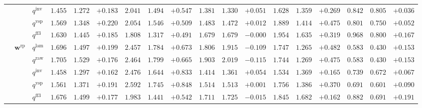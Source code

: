 \documentclass[eng]{kjas3}
\begin{document}
\begin{table}[t]
{\begin{tabular}{lll ccc ccc ccc ccc ccc}
 &  & $q^{\mathrm{inv}}$ & $1.455$ & $1.272$ & \cellcolor{posgreen!50}$+0.183$ & $2.041$ & $1.494$ & \cellcolor{posgreen!50}$+0.547$ & $1.381$ & $1.330$ & \cellcolor{posgreen!50}$+0.051$ & $1.628$ & $1.359$ & \cellcolor{posgreen!50}$+0.269$ & $0.842$ & $0.805$ & \cellcolor{posgreen!50}$+0.036$ \\
 &  & $q^{\mathrm{vsp}}$ & $1.569$ & $1.348$ & \cellcolor{posgreen!50}$+0.220$ & $2.054$ & $1.546$ & \cellcolor{posgreen!50}$+0.509$ & $1.483$ & $1.472$ & \cellcolor{posgreen!50}$+0.012$ & $1.889$ & $1.414$ & \cellcolor{posgreen!50}$+0.475$ & $0.801$ & $0.750$ & \cellcolor{posgreen!50}$+0.052$ \\
 &  & $q^{\mathrm{ff3}}$ & $1.630$ & $1.445$ & \cellcolor{posgreen!50}$+0.185$ & $1.808$ & $1.317$ & \cellcolor{posgreen!50}$+0.491$ & $1.679$ & $1.679$ & $-0.000$ & $1.954$ & $1.635$ & \cellcolor{posgreen!50}$+0.319$ & $0.968$ & $0.800$ & \cellcolor{posgreen!50}$+0.167$ \\
\cmidrule(lr){2-18}
 & $\mathbf{w}^{\mathrm{rp}}$ & $q^{\mathrm{lam}}$ & $1.696$ & $1.497$ & \cellcolor{posgreen!50}$+0.199$ & $2.457$ & $1.784$ & \cellcolor{posgreen!50}$+0.673$ & $1.806$ & $1.915$ & \cellcolor{negred!50}$-0.109$ & $1.747$ & $1.265$ & \cellcolor{posgreen!50}$+0.482$ & $0.583$ & $0.430$ & \cellcolor{posgreen!50}$+0.153$ \\
 &  & $q^{\mathrm{raw}}$ & $1.705$ & $1.529$ & \cellcolor{posgreen!50}$+0.176$ & $2.464$ & $1.799$ & \cellcolor{posgreen!50}$+0.665$ & $1.903$ & $2.019$ & \cellcolor{negred!50}$-0.115$ & $1.744$ & $1.269$ & \cellcolor{posgreen!50}$+0.475$ & $0.583$ & $0.430$ & \cellcolor{posgreen!50}$+0.153$ \\
 &  & $q^{\mathrm{inv}}$ & $1.458$ & $1.297$ & \cellcolor{posgreen!50}$+0.162$ & $2.476$ & $1.644$ & \cellcolor{posgreen!50}$+0.833$ & $1.414$ & $1.361$ & \cellcolor{posgreen!50}$+0.054$ & $1.534$ & $1.369$ & \cellcolor{posgreen!50}$+0.165$ & $0.739$ & $0.672$ & \cellcolor{posgreen!50}$+0.067$ \\
 &  & $q^{\mathrm{vsp}}$ & $1.561$ & $1.371$ & \cellcolor{posgreen!50}$+0.191$ & $2.592$ & $1.745$ & \cellcolor{posgreen!50}$+0.848$ & $1.514$ & $1.513$ & \cellcolor{posgreen!50}$+0.001$ & $1.756$ & $1.386$ & \cellcolor{posgreen!50}$+0.370$ & $0.691$ & $0.601$ & \cellcolor{posgreen!50}$+0.090$ \\
 &  & $q^{\mathrm{ff3}}$ & $1.676$ & $1.499$ & \cellcolor{posgreen!50}$+0.177$ & $1.983$ & $1.441$ & \cellcolor{posgreen!50}$+0.542$ & $1.711$ & $1.725$ & \cellcolor{negred!50}$-0.015$ & $1.845$ & $1.682$ & \cellcolor{posgreen!50}$+0.162$ & $0.882$ & $0.691$ & \cellcolor{posgreen!50}$+0.191$ \\
\bottomrule
\end{tabular}}
\end{table}
\end{document}
